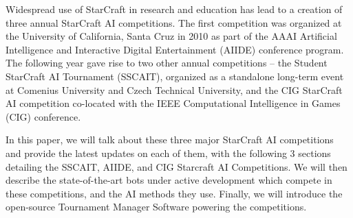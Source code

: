 Widespread use of StarCraft in research and education has lead to a creation of three annual StarCraft AI competitions. The first competition was organized at the University of California, Santa Cruz in 2010 as part of the AAAI Artificial Intelligence and Interactive Digital Entertainment (AIIDE) conference program. The following year gave rise to two other annual competitions -- the Student StarCraft AI Tournament (SSCAIT), organized as a standalone long-term event at Comenius University and Czech Technical University, and the CIG StarCraft AI competition co-located with the IEEE Computational Intelligence in Games (CIG) conference.

In this paper, we will talk about these three major StarCraft AI competitions and provide the latest updates on each of them, with the following 3 sections detailing the SSCAIT, AIIDE, and CIG Starcraft AI Competitions. We will then describe the state-of-the-art bots under active development which compete in these competitions, and the AI methods they use. Finally, we will introduce the open-source Tournament Manager Software powering the competitions. 




